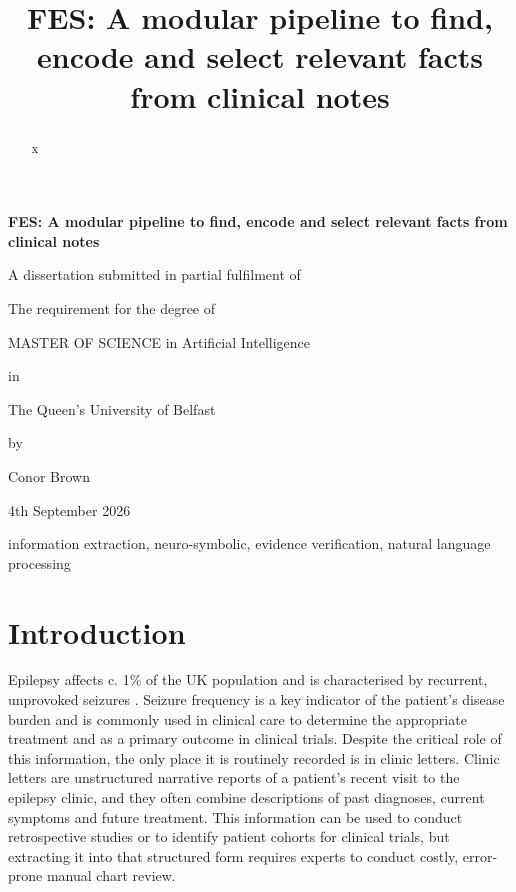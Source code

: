 \documentclass[conference]{IEEEtran}
\begin{document}
\begin{titlepage}
    \centering

    {\Huge\bfseries FES: A modular pipeline to find, encode and select relevant facts from clinical notes\par}
    \vspace{2cm}

    {\large
    A dissertation submitted in partial fulfilment of\par
    The requirement for the degree of\par
    MASTER OF SCIENCE in Artificial Intelligence\par
    in\par
    The Queen’s University of Belfast\par
    by\par
    Conor Brown\par
    4th September 2026
    }
\end{titlepage}

\title{FES: A modular pipeline to find, encode and select relevant facts from clinical notes\\}

\maketitle

\begin{abstract}
x
\end{abstract}

\begin{IEEEkeywords}
information extraction, neuro-symbolic, evidence verification, 
natural language processing
\end{IEEEkeywords}

\section{Introduction}

Epilepsy affects c. 1\% of the UK population \cite{b1} and is 
characterised by recurrent, unprovoked seizures \cite{b2}. 
Seizure frequency is a key indicator of the patient's disease
burden and is commonly used in clinical care to determine 
the appropriate treatment and as a primary outcome in 
clinical trials. Despite the critical role of this information, the 
only place it is routinely recorded is in clinic letters. Clinic 
letters are unstructured narrative reports of a patient's
recent visit to the epilepsy clinic, and they often 
combine descriptions of past diagnoses, current symptoms 
and future treatment. This information can be used to 
conduct retrospective studies or to identify patient cohorts 
for clinical trials, but extracting it into that structured form 
requires experts to conduct costly, error-prone manual 
chart review. 
\end{document}
